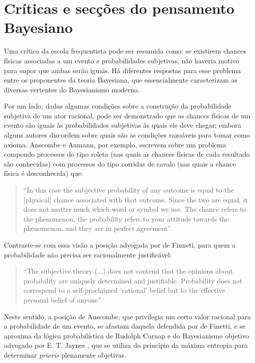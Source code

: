 \section{Críticas e secções do pensamento Bayesiano}

Uma crítica da escola frequentista pode ser resumida como: se existirem chances físicas associadas a um evento
e probabilidades subjetivas, não haveria motivo para supor que ambas serão iguais. Há diferentes respostas para esse problema 
entre os proponentes da teoria Bayesiana, que essencialmente caracterizam as diversas vertentes do Bayesianismo
moderno.

Por um lado, dadas algumas condições sobre a construção da
probabilidade subjetiva de um ator racional, pode ser demonstrado que as chances físicas de um evento são iguais 
às probabilidades subjetivas às quais ele deve chegar; embora
alguns autores discordem sobre quais são as condições razoáveis para tomar como axioma. Anscombe e Aumann, por exemplo,
escrevem sobre um problema compondo processos do tipo roleta (nas quais as chances físicas de cada resultado são conhecidas) 
com processos do tipo corridas de cavalo (nas quais a chance física é desconhecida) que:

\begin{quote}
``In this case the subjective probability of any outcome is equal to the [physical] chance associated with that outcome.
Since the two are equal, it does not matter much which word or symbol we use. The
chance refers to the phenomenon, the probability refers to your attitude
towards the phenomenon, and they are in perfect agreement''\citep{Anscombe63}
\end{quote}

Contraste-se com essa visão a posição advogada por de Finneti, para quem a probabilidade não precisa ser racionalmente
justificável:

\begin{quote}
``The subjective theory (...) does not contend that the opinions about probability are uniquely determined and
justifiable. Probability does not correspond to a self-proclaimed `rational' belief but to the effective personal
belief of anyone''\citep{deFinetti51}
\end{quote}

Neste sentido, a posição de Anscombe, que privilegia um certo valor racional para a probabilidade de um evento,
se afastam daquela defendida por de Finetti, e se aproxima da lógica probabilística de Rudolph Carnap e do Bayesianismo
objetivo advogado por E. T. Jaynes \citep{Jaynes68}, que se utiliza do princípio da máxima entropia para determinar
{\em prioris} plenamente objetivas.

